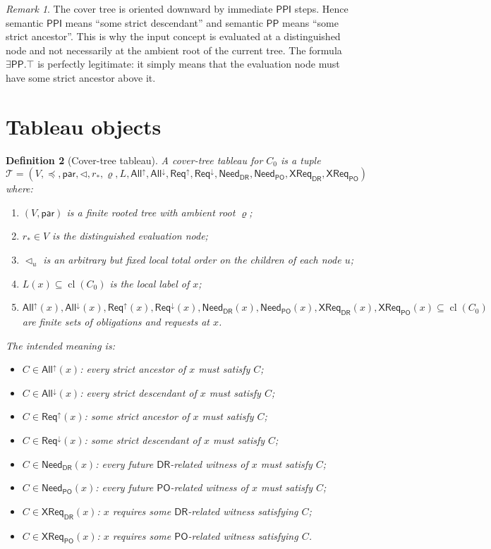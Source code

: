 \documentclass[11pt]{article}
\newtheorem{definition}{Definition}[section]
\theoremstyle{remark}
\newtheorem{remark}[definition]{Remark}
\newcommand{\DR}{\mathsf{DR}}
\newcommand{\PO}{\mathsf{PO}}
\newcommand{\PP}{\mathsf{PP}}
\newcommand{\PPI}{\mathsf{PPI}}
\newcommand{\cl}{\operatorname{cl}}
\newcommand{\ReqUp}{\mathsf{Req}^{\uparrow}}
\newcommand{\ReqDown}{\mathsf{Req}^{\downarrow}}
\newcommand{\AllUp}{\mathsf{All}^{\uparrow}}
\newcommand{\AllDown}{\mathsf{All}^{\downarrow}}
\newcommand{\CrossDR}{\mathsf{XReq}_{\DR}}
\newcommand{\CrossPO}{\mathsf{XReq}_{\PO}}
\newcommand{\NeedDR}{\mathsf{Need}_{\DR}}
\newcommand{\NeedPO}{\mathsf{Need}_{\PO}}
\begin{document}
\begin{remark}
The cover tree is oriented downward by immediate $\PPI$ steps. Hence semantic $\PPI$ means ``some strict descendant'' and semantic $\PP$ means ``some strict ancestor''. This is why the input concept is evaluated at a distinguished node and not necessarily at the ambient root of the current tree. The formula $\exists\PP.\top$ is perfectly legitimate: it simply means that the evaluation node must have some strict ancestor above it.
\end{remark}

\section{Tableau objects}

\begin{definition}[Cover-tree tableau]\label{def:tableau-object}
A \emph{cover-tree tableau} for $C_0$ is a tuple
\[
\mathcal T=(V,\preceq,\mathsf{par},\triangleleft, r_\ast, \varrho, L, \AllUp, \AllDown, \ReqUp, \ReqDown, \NeedDR, \NeedPO, \CrossDR, \CrossPO)
\]
where:
\begin{enumerate}[label=(\roman*)]
    \item $(V,\mathsf{par})$ is a finite rooted tree with ambient root $\varrho$;
    \item $r_\ast\in V$ is the distinguished \emph{evaluation node};
    \item $\triangleleft_u$ is an arbitrary but fixed local total order on the children of each node $u$;
    \item $L(x)\subseteq \cl(C_0)$ is the local label of $x$;
    \item $\AllUp(x),\AllDown(x),\ReqUp(x),\ReqDown(x),\NeedDR(x),\NeedPO(x),\CrossDR(x),\CrossPO(x)\subseteq \cl(C_0)$ are finite sets of obligations and requests at $x$.
\end{enumerate}
The intended meaning is:
\begin{itemize}
    \item $C\in \AllUp(x)$: every strict ancestor of $x$ must satisfy $C$;
    \item $C\in \AllDown(x)$: every strict descendant of $x$ must satisfy $C$;
    \item $C\in \ReqUp(x)$: some strict ancestor of $x$ must satisfy $C$;
    \item $C\in \ReqDown(x)$: some strict descendant of $x$ must satisfy $C$;
    \item $C\in \NeedDR(x)$: every future $\DR$-related witness of $x$ must satisfy $C$;
    \item $C\in \NeedPO(x)$: every future $\PO$-related witness of $x$ must satisfy $C$;
    \item $C\in \CrossDR(x)$: $x$ requires some $\DR$-related witness satisfying $C$;
    \item $C\in \CrossPO(x)$: $x$ requires some $\PO$-related witness satisfying $C$.
\end{itemize}
\end{definition}
\end{document}
